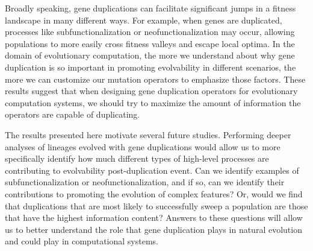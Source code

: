 Broadly speaking, gene duplications can facilitate significant jumps in a fitness landscape in many different ways. For example, when genes are duplicated, processes like subfunctionalization or neofunctionalization may occur, allowing populations to more easily cross fitness valleys and escape local optima. In the domain of evolutionary computation, the more we understand about why gene duplication is so important in promoting evolvability in different scenarios, the more we can customize our mutation operators to emphasize those factors.
These results suggest that when designing gene duplication operators for evolutionary computation systems, we should try to maximize the amount of information the operators are capable of duplicating.

The results presented here motivate several future studies. Performing deeper analyses of lineages evolved with gene duplications would allow us to more specifically identify how much different types of high-level processes are contributing to evolvability post-duplication event. Can we identify examples of subfunctionalization or neofunctionalization, and if so, can we identify their contributions to promoting the evolution of complex features? Or, would we find that duplications that are most likely to successfully sweep a population are those that have the highest information content?  Answers to these questions will allow us to better understand the role that gene duplication plays in natural evolution and could play in computational systems.

